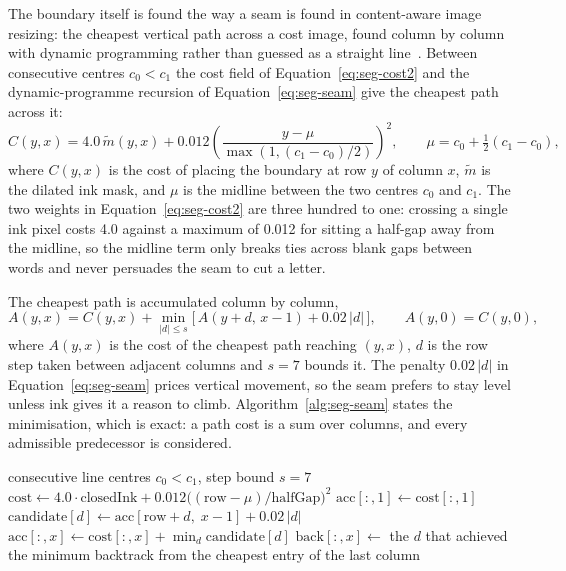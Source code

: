 The boundary itself is found the way a seam is found in content-aware image resizing: the cheapest vertical path across a cost image, found column by column with dynamic programming rather than guessed as a straight line~\cite[p.~10:3]{avidan2007}. Between consecutive centres $c_0<c_1$ the cost field of Equation~\ref{eq:seg-cost2} and the dynamic-programme recursion of Equation~\ref{eq:seg-seam} give the cheapest path across it:
\begin{equation}
C(y,x)=4.0\,\tilde m(y,x)+0.012\left(\frac{y-\mu}{\max(1,(c_1-c_0)/2)}\right)^{\!2},\qquad \mu=c_0+\tfrac12(c_1-c_0),
\label{eq:seg-cost2}
\end{equation}
where $C(y,x)$ is the cost of placing the boundary at row $y$ of column $x$, $\tilde m$ is the dilated ink mask, and $\mu$ is the midline between the two centres $c_0$ and $c_1$. The two weights in Equation~\ref{eq:seg-cost2} are three hundred to one: crossing a single ink pixel costs 4.0 against a maximum of 0.012 for sitting a half-gap away from the midline, so the midline term only breaks ties across blank gaps between words and never persuades the seam to cut a letter.

The cheapest path is accumulated column by column,
\begin{equation}
A(y,x)=C(y,x)+\min_{|d|\le s}\bigl[\,A(y+d,\,x-1)+0.02\,|d|\,\bigr],\qquad A(y,0)=C(y,0),
\label{eq:seg-seam}
\end{equation}
where $A(y,x)$ is the cost of the cheapest path reaching $(y,x)$, $d$ is the row step taken between adjacent columns and $s=7$ bounds it. The penalty $0.02\,|d|$ in Equation~\ref{eq:seg-seam} prices vertical movement, so the seam prefers to stay level unless ink gives it a reason to climb. Algorithm~\ref{alg:seg-seam} states the minimisation, which is exact: a path cost is a sum over columns, and every admissible predecessor is considered.

\begin{algorithm}[!htbp]
\caption{The least-ink seam between two line centres}
\label{alg:seg-seam}
\begin{algorithmic}[1]
\REQUIRE consecutive line centres $c_0<c_1$, step bound $s=7$
\STATE $\mathrm{cost}\leftarrow 4.0\cdot\mathrm{closedInk}+0.012\bigl((\mathrm{row}-\mu)/\mathrm{halfGap}\bigr)^2$ 
\STATE $\mathrm{acc}[:,1]\leftarrow \mathrm{cost}[:,1]$
        \STATE $\mathrm{candidate}[d]\leftarrow \mathrm{acc}[\mathrm{row}+d,\;x-1]+0.02\,|d|$
    \ENDFOR
    \STATE $\mathrm{acc}[:,x]\leftarrow \mathrm{cost}[:,x]+\min_d \mathrm{candidate}[d]$ 
    \STATE $\mathrm{back}[:,x]\leftarrow$ the $d$ that achieved the minimum
\ENDFOR
\STATE backtrack from the cheapest entry of the last column
\end{algorithmic}
\end{algorithm}

